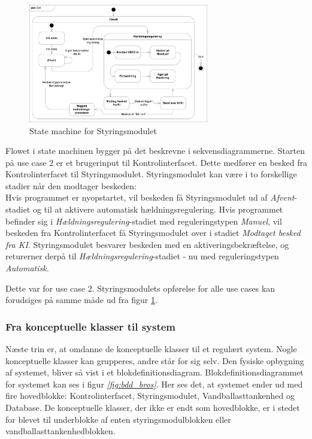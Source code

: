 \begin{figure}[H]
\centering
\includegraphics[width=0.7\textwidth]{billeder/Systemarkitektur/stm_sm}
\caption{State machine for Styringsmodulet}
\label{fig:stm_sm}
\end{figure}

Flowet i state machinen bygger på det beskrevne i sekvensdiagrammerne. Starten på use case 2 er et brugerinput til Kontrolinterfacet. Dette medfører en besked fra Kontrolinterfacet til Styringsmodulet. Styringsmodulet kan være i to forskellige stadier når den modtager beskeden:\\
Hvis programmet er nyopstartet, vil beskeden få Styringsmodulet ud af \textit{Afvent}-stadiet og til at aktivere automatisk hældningsregulering. Hvis programmet befinder sig i \textit{Hældningsregulering}-stadiet med reguleringstypen \textit{Manuel}, vil beskeden fra Kontrolinterfacet få Styringsmodulet over i stadiet \textit{Modtaget besked fra KI}. Styringsmodulet besvarer beskeden med en aktiveringsbekræftelse, og returerner derpå til \textit{Hældningsregulering}-stadiet - nu med reguleringstypen \textit{Automatisk}.

Dette var for use case 2. Styringsmodulets opførelse for alle use cases kan forudsiges på samme måde ud fra figur \ref{fig:stm_sm}. 

\subsubsection{Fra konceptuelle klasser til system}
Næste trin er, at omdanne de konceptuelle klasser til et regulært system. Nogle konceptuelle klasser kan grupperes, andre står for sig selv. Den fysiske opbygning af systemet, bliver så vist i et blokdefinitionsdiagram. Blokdefinitionsdiagrammet for systemet kan ses i figur \textit{\ref{fig:bdd_bros}}. Her ses det, at systemet ender ud med fire hovedblokke: Kontrolinterfacet, Styringsmodulet, Vandballasttankenhed og Database. De konceptuelle klasser, der ikke er endt som hovedblokke, er i stedet for blevet til underblokke af enten styringsmodulblokken eller vandballasttankenhedblokken.


